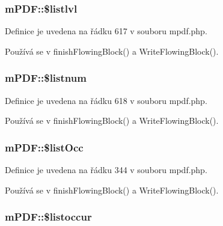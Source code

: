 \hypertarget{classm_p_d_f_a74f37c019a09b13cab1c5a17e5542a4b}{
\subsubsection[{\$listlvl}]{\setlength{\rightskip}{0pt plus 5cm}m\-P\-D\-F\-::\$listlvl}}\label{classm_p_d_f_a74f37c019a09b13cab1c5a17e5542a4b}


Definice je uvedena na řádku 617 v souboru mpdf.\-php.



Používá se v finish\-Flowing\-Block() a Write\-Flowing\-Block().

\hypertarget{classm_p_d_f_ac9d920df974f675cf3fd8797c153f3a0}{
\subsubsection[{\$listnum}]{\setlength{\rightskip}{0pt plus 5cm}m\-P\-D\-F\-::\$listnum}}\label{classm_p_d_f_ac9d920df974f675cf3fd8797c153f3a0}


Definice je uvedena na řádku 618 v souboru mpdf.\-php.



Používá se v finish\-Flowing\-Block() a Write\-Flowing\-Block().

\hypertarget{classm_p_d_f_af16d05b1def90fc1b911122eef85f36d}{
\subsubsection[{\$list\-Occ}]{\setlength{\rightskip}{0pt plus 5cm}m\-P\-D\-F\-::\$list\-Occ}}\label{classm_p_d_f_af16d05b1def90fc1b911122eef85f36d}


Definice je uvedena na řádku 344 v souboru mpdf.\-php.



Používá se v finish\-Flowing\-Block() a Write\-Flowing\-Block().

\hypertarget{classm_p_d_f_ac3f05f3ae1e191ee4b871346dd73cf85}{
\subsubsection[{\$listoccur}]{\setlength{\rightskip}{0pt plus 5cm}m\-P\-D\-F\-::\$listoccur}}\label{classm_p_d_f_ac3f05f3ae1e191ee4b871346dd73cf85}


